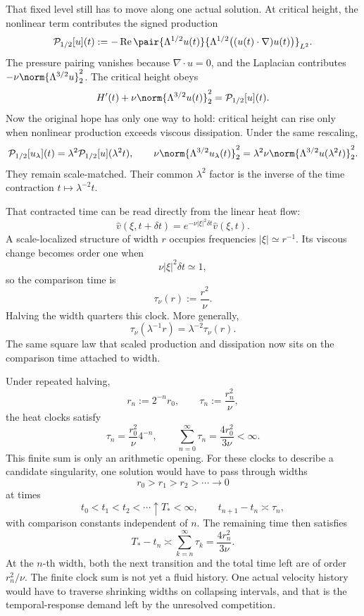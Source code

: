 
That fixed level still has to move along one actual solution. At critical height, the nonlinear term contributes the signed production
\[
  \mathcal P_{1/2}[u](t)
  :=
  -\operatorname{Re}
  \pair
    {\Lambda^{1/2}u(t)}
    {\Lambda^{1/2}\bigl((u(t)\cdot\nabla)u(t)\bigr)}_{L^2}.
\]
The pressure pairing vanishes because \(\nabla\cdot u=0\), and the Laplacian contributes \(-\nu\norm{\Lambda^{3/2}u}_2^2\). The critical height obeys
\[
  H'(t)
  +
  \nu\norm{\Lambda^{3/2}u(t)}_2^2
  =
  \mathcal P_{1/2}[u](t).
\]
Now the original hope has only one way to hold: critical height can rise only when nonlinear production exceeds viscous dissipation. Under the same rescaling,
\[
  \mathcal P_{1/2}[u_\lambda](t)
  =
  \lambda^2\mathcal P_{1/2}[u](\lambda^2t),
  \qquad
  \nu\norm{\Lambda^{3/2}u_\lambda(t)}_2^2
  =
  \lambda^2\nu\norm{\Lambda^{3/2}u(\lambda^2t)}_2^2.
\]
They remain scale-matched. Their common \(\lambda^2\) factor is the inverse of the time contraction \(t\mapsto\lambda^{-2}t\).


That contracted time can be read directly from the linear heat flow:
\[
  \widehat v(\xi,t+\delta t)
  =
  e^{-\nu|\xi|^2\delta t}\widehat v(\xi,t).
\]
A scale-localized structure of width \(r\) occupies frequencies \(|\xi|\simeq r^{-1}\). Its viscous change becomes order one when
\[
  \nu|\xi|^2\delta t\simeq1,
\]
so the comparison time is
\[
  \tau_\nu(r)
  :=
  \frac{r^2}{\nu}.
\]
Halving the width quarters this clock. More generally,
\[
  \tau_\nu(\lambda^{-1}r)
  =
  \lambda^{-2}\tau_\nu(r).
\]
The same square law that scaled production and dissipation now sits on the comparison time attached to width.


Under repeated halving,
\[
  r_n:=2^{-n}r_0,
  \qquad
  \tau_n:=\frac{r_n^2}{\nu},
\]
the heat clocks satisfy
\[
  \tau_n
  =
  \frac{r_0^2}{\nu}4^{-n},
  \qquad
  \sum_{n=0}^{\infty}\tau_n
  =
  \frac{4r_0^2}{3\nu}
  <
  \infty.
\]
This finite sum is only an arithmetic opening. For these clocks to describe a candidate singularity, one \NavierStokes{} solution would have to pass through widths
\[
  r_0>r_1>r_2>\cdots\longrightarrow0
\]
at times
\[
  t_0<t_1<t_2<\cdots\uparrow T_*<\infty,
  \qquad
  t_{n+1}-t_n\asymp\tau_n,
\]
with comparison constants independent of \(n\). The remaining time then satisfies
\[
  T_*-t_n
  \asymp
  \sum_{k=n}^{\infty}\tau_k
  =
  \frac{4r_n^2}{3\nu}.
\]
At the \(n\)-th width, both the next transition and the total time left are of order \(r_n^2/\nu\). The finite clock sum is not yet a fluid history. One actual velocity history would have to traverse shrinking widths on collapsing intervals, and that is the temporal-response demand left by the unresolved competition.